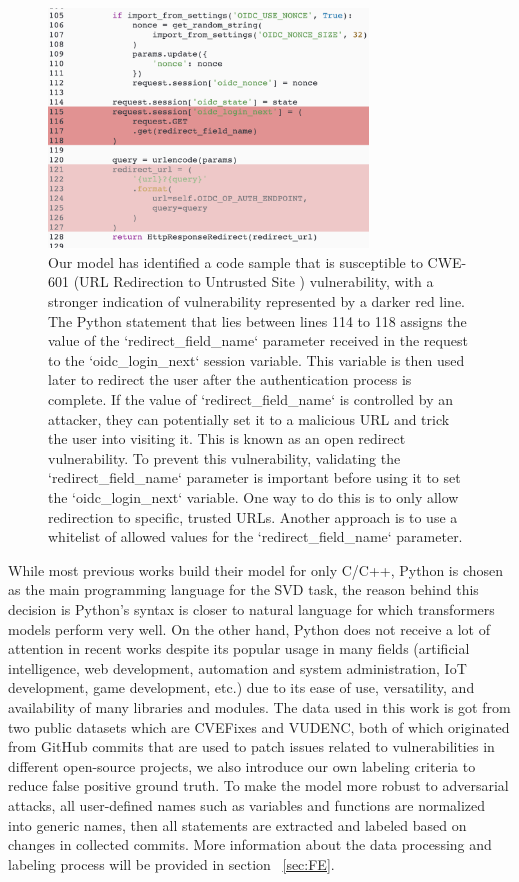 \documentclass{ieeeaccess}
\begin{document}
\begin{figure}[h]
    \centering
    \includegraphics[width=85mm]{sample.png}
    \caption{Our model has identified a code sample that is susceptible to CWE-601 (URL Redirection to Untrusted Site ) vulnerability, with a stronger indication of vulnerability represented by a darker red line. The Python statement that lies between lines 114 to 118  assigns the value of the `redirect\_field\_name` parameter received in the request to the `oidc\_login\_next` session variable. This variable is then used later to redirect the user after the authentication process is complete. If the value of `redirect\_field\_name` is controlled by an attacker, they can potentially set it to a malicious URL and trick the user into visiting it. This is known as an open redirect vulnerability. To prevent this vulnerability, validating the `redirect\_field\_name` parameter is important before using it to set the `oidc\_login\_next` variable. One way to do this is to only allow redirection to specific, trusted URLs. Another approach is to use a whitelist of allowed values for the `redirect\_field\_name` parameter.}
    \label{fig:sample}  
\end{figure}
\par While most previous works build their model for only C/C++, Python is chosen as the main programming language for the SVD task, the reason behind this decision is Python's syntax is closer to natural language for which transformers models perform very well\cite{Embeds_comparison}. On the other hand, Python does not receive a lot of attention in recent works despite its popular usage in many fields (artificial intelligence, web development, automation and system administration, IoT development, game development, etc.) due to its ease of use, versatility, and availability of many libraries and modules. The data used in this work is got from two public datasets which are CVEFixes\cite{cvefixes} and VUDENC\cite{VUDENC}, both of which originated from GitHub commits that are used to patch issues related to vulnerabilities in different open-source projects, we also introduce our own labeling criteria to reduce false positive ground truth. To make the model more robust to adversarial attacks, all user-defined names such as variables and functions are normalized into generic names, then all statements are extracted and labeled based on changes in collected commits. More information about the data processing and labeling process will be provided in section ~\ref{sec:FE}.
\end{document}

